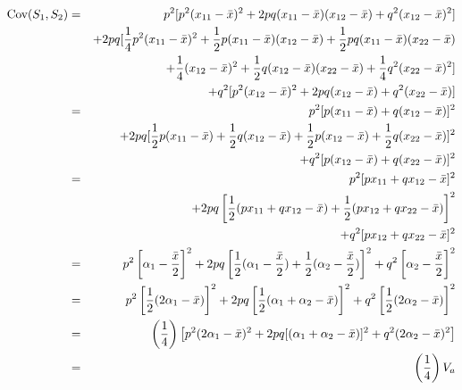 \documentclass[12pt]{article}
\begin{document}
\begin{eqnarray*}
\mbox{Cov}(S_1,S_2) &=& p^2[p^2(x_{11} - {\bar x})^2 + 2pq(x_{11} - {\bar x})
                                                (x_{12} - {\bar x})
                                           + q^2(x_{12} - {\bar x})^2] \\
             &&+ 2pq[{1 \over 4}p^2(x_{11} - {\bar x})^2
                  + {1 \over 2}p(x_{11} - {\bar x})(x_{12} - {\bar x})
                  + {1 \over 2}pq(x_{11} - {\bar x})(x_{22} - {\bar x}) \\
             &&\ \ + {1 \over 4}(x_{12} - {\bar x})^2
                  + {1 \over 2}q(x_{12} - {\bar x})(x_{22} - {\bar x})
                  + {1 \over 4}q^2(x_{22} - {\bar x})^2] \\
             &&+ q^2[p^2(x_{12} - {\bar x})^2 + 2pq(x_{12} - {\bar x})
                                                 + q^2(x_{22} - {\bar
                                                x})] \\
   &=&\ p^2[p(x_{11} - {\bar x}) + q(x_{12} - {\bar x})]^2 \\
   &&+ 2pq[{1 \over 2}p(x_{11} - {\bar x}) +
         {1 \over 2}q(x_{12} - {\bar x}) +
         {1 \over 2}p(x_{12} - {\bar x}) +
         {1 \over 2}q(x_{22} - {\bar x})]^2 \\
   &&+ q^2[p(x_{12} - {\bar x}) + q(x_{22} - {\bar x})]^2 \\
   &=&\ p^2[px_{11} + qx_{12} - {\bar x}]^2 \\
   &&+ 2pq\left[{1 \over 2}(px_{11} + qx_{12} - {\bar x}) +
         {1 \over 2}(px_{12} + qx_{22} - {\bar x})\right]^2 \\
   &&+ q^2[px_{12} + qx_{22} - {\bar x}]^2 \\
   &=&\ p^2\left[\alpha_1 - {{\bar x} \over 2}\right]^2
   + 2pq\left[{1 \over 2}(\alpha_1 - {{\bar x} \over 2}) +
         {1 \over 2}(\alpha_2 - {{\bar x} \over 2})\right]^2
   + q^2\left[\alpha_2 - {{\bar x} \over 2}\right]^2 \\
   &=&\ p^2\left[{1 \over 2}(2\alpha_1 - {\bar x})\right]^2
   + 2pq\left[{1 \over 2}(\alpha_1 + \alpha_2 - {\bar x})\right]^2
        + q^2\left[{1 \over 2}(2\alpha_2 - {\bar x})\right]^2 \\
   &=& \left({1 \over 4}\right)
      \left[p^2(2\alpha_1 - {\bar x})^2
        + 2pq[(\alpha_1+\alpha_2 - {\bar x})]^2
        + q^2(2\alpha_2 - {\bar x})^2\right] \\
   &=& \left({1 \over 4}\right)V_a
\end{eqnarray*}
\end{document}
